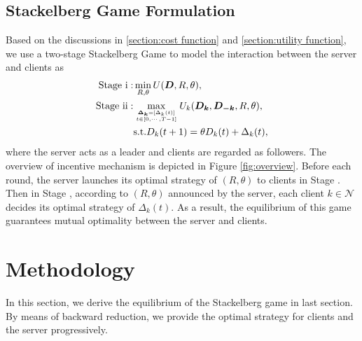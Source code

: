 \documentclass{article}
\theoremstyle{plain}
\theoremstyle{definition}
\theoremstyle{remark}
\begin{document}
\subsection{Stackelberg Game Formulation}
Based on the discussions in \ref{section:cost function} and \ref{section:utility function}, we use a two-stage Stackelberg Game to model the interaction between the server and clients as
\begin{equation}
  \begin{aligned}
    \mathrm{Stage\ \uppercase\expandafter{\romannumeral1}:} & 
    \min_{R, \theta}  U(\boldsymbol{D}, R, \theta), \\
    \mathrm{Stage\ \uppercase\expandafter{\romannumeral2}:} &
    \max_{\boldsymbol{\Delta_k}=[\Delta_k(t)] \atop t \in [0,\cdots,T-1]} U_k(\boldsymbol{D_k}, \boldsymbol{D_{-k}}, R, \theta), \\
    & \text{s.t.} D_k(t + 1) = \theta D_k(t) + \Delta_k(t),
  \end{aligned}  
\end{equation}
where the server acts as a leader and clients are regarded as followers.
The overview of incentive mechanism is depicted in Figure \ref{fig:overview}. Before each round, the server launches its optimal strategy of $(R, \theta)$ to clients in Stage \uppercase\expandafter{}.
Then in Stage \uppercase\expandafter{}, according to $(R, \theta)$ announced by the server, each client $k \in \mathcal{N}$ decides its optimal strategy of $\Delta_k(t)$.
As a result, the equilibrium of this game guarantees mutual optimality between the server and clients.

\section{Methodology}
In this section, we derive the equilibrium of the Stackelberg game in last section.
By means of backward reduction, we provide the optimal strategy for clients and the server progressively.
\end{document}
